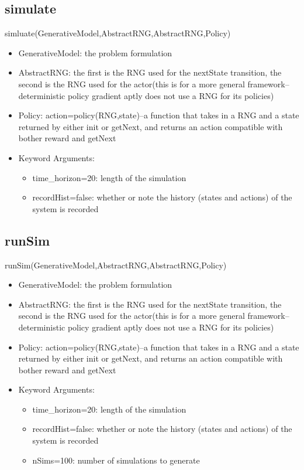 \documentclass[a4paper]{article}
\begin{document}
\subsection{simulate}
simluate(GenerativeModel,AbstractRNG,AbstractRNG,Policy)
\begin{itemize}
\item GenerativeModel: the problem formulation
\item AbstractRNG: the first is the RNG used for the nextState transition, the second is the RNG used for the actor(this is for a more general framework--deterministic policy gradient aptly does not use a RNG for its policies)
\item Policy: action=policy(RNG,state)--a function that takes in a RNG and a state returned by either init or getNext, and returns an action compatible with bother reward and getNext
\item Keyword Arguments:
	\begin{itemize}
	\item time\_horizon=20: length of the simulation
	\item recordHist=false: whether or note the history (states and actions) of the system is recorded
	\end{itemize}
\end{itemize}

\subsection{runSim}
runSim(GenerativeModel,AbstractRNG,AbstractRNG,Policy)
\begin{itemize}
\item GenerativeModel: the problem formulation
\item AbstractRNG: the first is the RNG used for the nextState transition, the second is the RNG used for the actor(this is for a more general framework--deterministic policy gradient aptly does not use a RNG for its policies)
\item Policy: action=policy(RNG,state)--a function that takes in a RNG and a state returned by either init or getNext, and returns an action compatible with bother reward and getNext
\item Keyword Arguments:
	\begin{itemize}
	\item time\_horizon=20: length of the simulation
	\item recordHist=false: whether or note the history (states and actions) of the system is recorded
	\item nSims=100: number of simulations to generate
	\end{itemize}
\end{itemize}
\end{document}
